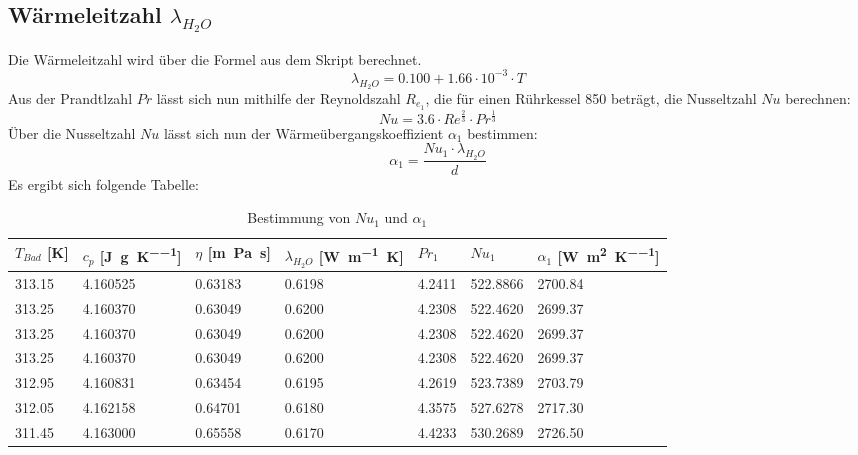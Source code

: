 \documentclass{article}
\begin{document}
\subsection{Wärmeleitzahl $\lambda _{H_2O}$}
Die Wärmeleitzahl wird über die Formel aus dem Skript berechnet.\cite{skript1}
\begin{equation}
  \lambda _{H_2O} = 0.100 + 1.66 \cdot 10 ^{-3} \cdot T
\end{equation}
Aus der Prandtlzahl $Pr$ lässt sich nun mithilfe der Reynoldszahl $R _{e_1} $, die für einen Rührkessel 850
beträgt, die Nusseltzahl $Nu$ berechnen:
\begin{equation}
  Nu = 3.6 \cdot Re ^{\frac{2}{3}} \cdot Pr ^{\frac{1}{3}}
\end{equation}
Über die Nusseltzahl $Nu$ lässt sich nun der Wärmeübergangskoeffizient $\alpha _1$ bestimmen:
\begin{equation}
  \alpha _1 = \frac{Nu _1 \cdot \lambda _{H_2O}}{d}
\end{equation}
Es ergibt sich folgende Tabelle:
\begin{table}[ht!]
  \centering
 \begin{tabularx}{\textwidth}{XXXXXXX}
$T _{Bad}$ [\si{\kelvin}] & $c _p$ [\si{\joule\per\gram\per\kelvin}]  & $\eta$ [\si{\meter\pascal\second}] &  $\lambda _{H_2O}$ [\si{\watt\per\meter\kelvin}]
& $Pr_1$ & $Nu _1$ & $\alpha _1$ [\si{\watt\per\square\meter\per\kelvin}] \\
\hline
\rowcolor{LightCyan}
313.15 & 4.160525 & 0.63183 & 0.6198 & 4.2411 & 522.8866 & 2700.84\\
313.25 & 4.160370 & 0.63049 & 0.6200 & 4.2308 & 522.4620 & 2699.37\\
313.25 & 4.160370 & 0.63049 & 0.6200 & 4.2308 & 522.4620 & 2699.37\\
313.25 & 4.160370 & 0.63049 & 0.6200 & 4.2308 & 522.4620 & 2699.37\\
312.95 & 4.160831 & 0.63454 & 0.6195 & 4.2619 & 523.7389 & 2703.79\\
312.05 & 4.162158 & 0.64701 & 0.6180 & 4.3575 & 527.6278 & 2717.30\\
311.45 & 4.163000 & 0.65558 & 0.6170 & 4.4233 & 530.2689 & 2726.50\\
\end{tabularx}
  \caption{Bestimmung von $Nu_1$ und $\alpha _1$}
\end{table}
\end{document}
